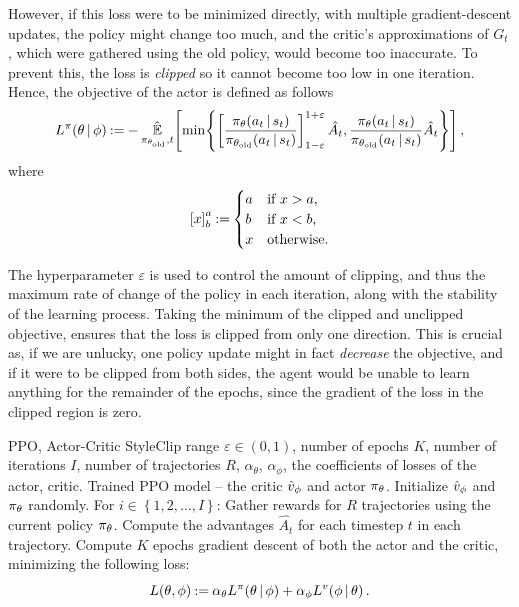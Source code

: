 However, if this loss were to be minimized directly, with multiple gradient-descent updates, the policy might change too much, and the critic's approximations of $ G_t $, which were gathered using the old policy, would become too inaccurate.
To prevent this, the loss is \emph{clipped} so it cannot become too low in one iteration.
Hence, the objective of the actor is defined as follows \begin{align*}
	\lossactor &\deq -\fceb {\EE_{\actor[\theta_{\text{old}}],t}}{\fcec\min{\left[ \frac{\fce\actor{a_t \suchthat s_t}}{\fce{\actor[\theta_{\text{old}}]}{a_t \suchthat s_t}} \right]^{1+\varepsilon}_{1-\varepsilon} \hat{A_t}, \frac{\fce\actor{a_t \suchthat s_t}}{\fce{\actor[\theta_{\text{old}}]}{a_t \suchthat s_t}} \hat{A_t}}}, \\
\end{align*}
where
\[
	\left[ x \right]^a_b \deq \begin{cases}
		a & \text{if $ x > a $,} \\
		b & \text{if $ x < b $,} \\
		x & \text{otherwise.}
	\end{cases}
\]

The hyperparameter $ \varepsilon $ is used to control the amount of clipping, and thus the maximum rate of change of the policy in each iteration, along with the stability of the learning process.
Taking the minimum of the clipped and unclipped objective, ensures that the loss is clipped from only one direction.
This is crucial as, if we are unlucky, one policy update might in fact \emph{decrease} the objective, and if it were to be clipped from both sides, the agent would be unable to learn anything for the remainder of the epochs, since the gradient of the loss in the clipped region is zero.

\begin{algor}{\label{alg:ppo}PPO, Actor-Critic Style}{Clip range $ \varepsilon \in \left( 0,1 \right) $, number of epochs $ K $, number of iterations $ I $, number of trajectories $ R $, $ \alpha_\theta $, $\alpha_\phi $, the coefficients of losses of the actor, critic.}
	{Trained PPO model -- the critic $ \critic $ and actor $ \actor $.}
	\State Initialize $ \critic $ and $ \actor $ randomly.
	\Indent For $ i \in \left\{ 1,2,\ldots,I \right\} $:
		\State Gather rewards for $ R $ trajectories using the current policy $ \actor $.
		\State Compute the advantages $ \hat{A_t} $ for each timestep $ t $ in each trajectory.
		\State Compute $ K $ epochs gradient descent of both the actor and the critic, minimizing the following loss: \[
			\fce{L}{\theta, \phi} \deq \alpha_\theta \lossactor + \alpha_\phi \losscritic.
		\]
	\EndIndent
\end{algor}

